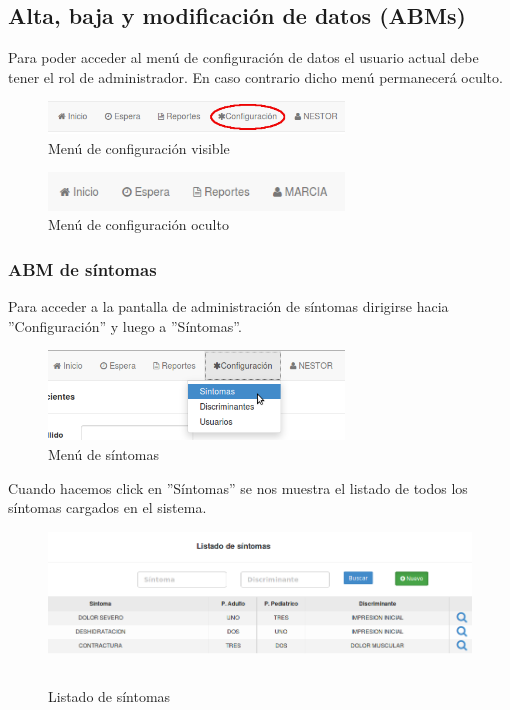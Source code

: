 \subsection{Alta, baja y modificación de datos (ABMs)}
Para poder acceder al menú de configuración de datos el usuario actual debe tener el rol de administrador. En caso contrario dicho menú permanecerá oculto.

\begin{figure}[h]
\centerline{\includegraphics[width=0.7\textwidth]{menu_configuracion_visible.png}}
\caption{Menú de configuración visible}
\end{figure}

\begin{figure}[h]
\centerline{\includegraphics[width=0.7\textwidth]{menu_configuracion_oculto.png}}
\caption{Menú de configuración oculto}
\end{figure}

\subsubsection{ABM de síntomas}
Para acceder a la pantalla de administración de síntomas dirigirse hacia ''Configuración'' y luego a ''Síntomas''.

\begin{figure}[h]
\centerline{\includegraphics[width=0.7\textwidth]{menu_sintomas.png}}
\caption{Menú de síntomas}
\end{figure}

Cuando hacemos click en ''Síntomas'' se nos muestra el listado de todos los síntomas cargados en el sistema.

\begin{figure}[h]
\centerline{\includegraphics[width=1\textwidth]{sintomas_listado.png}}
\caption{Listado de síntomas}
\end{figure}

